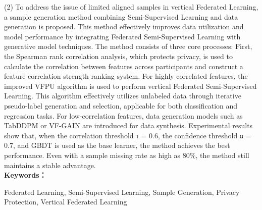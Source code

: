 (2) To address the issue of limited aligned samples in vertical Federated Learning, a sample generation method combining Semi-Supervised Learning and data generation is proposed. This method effectively improves data utilization and model performance by integrating Federated Semi-Supervised Learning with generative model techniques. The method consists of three core processes: First, the Spearman rank correlation analysis, which protects privacy, is used to calculate the correlation between features across participants and construct a feature correlation strength ranking system. For highly correlated features, the improved VFPU algorithm is used to perform vertical Federated Semi-Supervised Learning. This algorithm effectively utilizes unlabeled data through iterative pseudo-label generation and selection, applicable for both classification and regression tasks. For low-correlation features, data generation models such as TabDDPM or VF-GAIN are introduced for data synthesis. Experimental results show that, when the correlation threshold τ = 0.6, the confidence threshold α = 0.7, and GBDT is used as the base learner, the method achieves the best performance. Even with a sample missing rate as high as 80\%, the method still maintains a stable advantage.
\\


\noindent\textbf{Keywords：} 
\begin{minipage}[t]{0.85\linewidth}
	Federated Learning, Semi-Supervised Learning, Sample Generation, Privacy Protection, Vertical Federated Learning
\end{minipage}

\clearpage